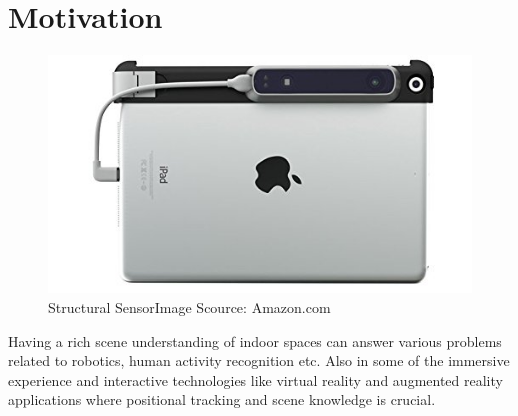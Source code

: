 \section{Motivation}
\begin{figure}[!b]
    \centering
    \includegraphics[width = 12cm]{Figures/ipad.jpg}
    \caption{Structural SensorImage Scource: Amazon.com}
    \label{fig:Structural_Sensor}
\end{figure}{}

Having a rich scene understanding of indoor spaces can answer various problems related to robotics, human activity recognition etc. Also in some of the immersive experience and interactive technologies like  virtual reality and augmented reality applications where positional tracking and scene knowledge is crucial.

